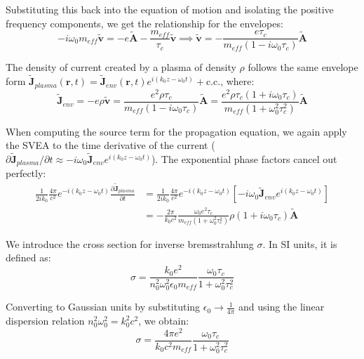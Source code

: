 \documentclass[11pt,a4paper]{article}
\begin{document}
Substituting this back into the equation of motion and isolating the positive frequency components, we get the relationship for the envelopes:
\begin{equation*}
-i\omega_0 m_{eff} \tilde{\mathbf{v}} = -e \tilde{\mathbf{A}} - \frac{m_{eff}}{\tau_c}\tilde{\mathbf{v}} \implies \tilde{\mathbf{v}} =  -\frac{e\tau_c}{m_{eff}(1-i\omega_0\tau_c)}\tilde{\mathbf{A}}
\end{equation*}

The density of current created by a plasma of density $\rho$ follows the same envelope form $\tilde{\mathbf{J}}_{plasma}(\mathbf{r},t) = \tilde{\mathbf{J}}_{env}(\mathbf{r},t) e^{i(k_0z-\omega_0t)} + \text{c.c.}$, where:
\begin{equation*}
\tilde{\mathbf{J}}_{env} = -e\rho\tilde{\mathbf{v}} = \frac{e^2\rho\tau_c}{m_{eff}(1-i\omega_0\tau_c)}\tilde{\mathbf{A}} = \frac{e^2\rho\tau_c(1+i\omega_0\tau_c)}{m_{eff}(1+\omega_0^2\tau_c^2)}\tilde{\mathbf{A}}
\end{equation*}

When computing the source term for the propagation equation, we again apply the SVEA to the time derivative of the current ($\partial \tilde{\mathbf{J}}_{plasma} / \partial t \approx -i\omega_0 \tilde{\mathbf{J}}_{env} e^{i(k_0z-\omega_0t)}$). The exponential phase factors cancel out perfectly:
\begin{equation*}
\begin{split}
\frac{1}{2ik_0} \frac{4\pi}{c^2}e^{-i(k_0z-\omega_0t)}\frac{\partial \tilde{\mathbf{J}}_{plasma}}{\partial t} &= \frac{1}{2ik_0} \frac{4\pi}{c^2} e^{-i(k_0z-\omega_0t)} \left[ -i\omega_0 \tilde{\mathbf{J}}_{env} e^{i(k_0z-\omega_0t)} \right] \\
&= -\frac{2\pi}{k_0 c^2} \frac{\omega_0 e^2 \tau_c}{m_{eff}(1+\omega_0^2\tau_c^2)} \rho(1+i\omega_0\tau_c) \tilde{\mathbf{A}}
\end{split}
\end{equation*}

We introduce the cross section for inverse bremsstrahlung $\sigma$. In SI units, it is defined as:
\begin{equation*}
\sigma = \frac{k_0 e^2}{n_0^2\omega_0^2\epsilon_0 m_{eff}} \frac{\omega_0\tau_c}{1+\omega_0^2\tau_c^2}
\end{equation*}

Converting to Gaussian units by substituting $\epsilon_0 \to \frac{1}{4\pi}$ and using the linear dispersion relation $n_0^2\omega_0^2 = k_0^2 c^2$, we obtain:
\begin{equation*}
\sigma = \frac{4\pi e^2}{k_0 c^2 m_{eff}} \frac{\omega_0\tau_c}{1+\omega_0^2\tau_c^2}
\end{equation*}
\end{document}
